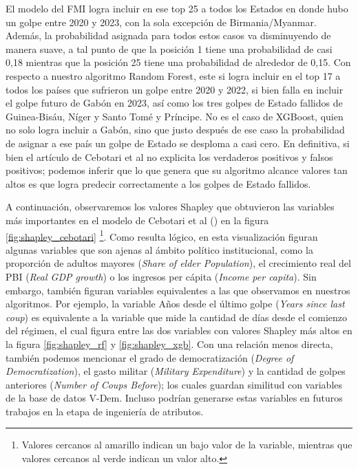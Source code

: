 \documentclass{article}
\begin{document}
El modelo del FMI logra incluir en ese top 25 a todos los Estados en donde hubo un golpe
entre 2020 y 2023, con la sola excepción de Birmania/Myanmar. Además, la probabilidad asignada para 
todos estos casos va disminuyendo de manera suave, a tal punto de que la posición 1 tiene una 
probabilidad de casi 0,18 mientras que la posición 25 tiene una probabilidad de alrededor de 0,15. Con
respecto a nuestro algoritmo Random Forest, este si logra incluir en el top 17 a todos los países que 
sufrieron un golpe entre 2020 y 2022, si bien falla en incluir el golpe futuro de Gabón en 2023, así como
los tres golpes de Estado fallidos de Guinea-Bisáu, Níger y Santo Tomé y Príncipe. No es 
el caso de XGBoost, quien no solo logra incluir a Gabón, sino que justo después de ese caso la 
probabilidad de asignar a ese país un golpe de Estado se desploma a casi cero. En definitiva, si bien 
el artículo de Cebotari et al no explicita los verdaderos positivos y falsos positivos; podemos inferir
que lo que genera que su algoritmo alcance valores tan altos es que logra predecir correctamente a los 
golpes de Estado fallidos.

A continuación, observaremos los valores Shapley que obtuvieron las variables más importantes en el
modelo de Cebotari et al (\citeyear{Ceb24}) en la figura \ref{fig:shapley_cebotari} \footnote{Valores 
cercanos al amarillo indican un bajo valor de la variable, mientras que valores cercanos al verde
indican un valor alto.}. Como resulta lógico, en esta visualización figuran algunas variables que son 
ajenas al ámbito político institucional, como
la proporción de adultos mayores (\textit{Share of elder Population}), el crecimiento real del PBI
(\textit{Real GDP growth}) o los ingresos per cápita (\textit{Income per capita}). Sin embargo, también
figuran variables equivalentes a las que observamos en nuestros algoritmos. Por ejemplo, la variable
Años desde el último golpe (\textit{Years since last coup}) es equivalente a la variable que mide la
cantidad de días desde el comienzo del régimen, el cual figura entre las dos variables con valores Shapley
más altos en la figura \ref{fig:shapley_rf} y \ref{fig:shapley_xgb}. Con una relación menos directa, también podemos
mencionar el grado de democratización (\textit{Degree of Democratization}), el gasto militar (\textit{Military
Expenditure}) y la cantidad de golpes anteriores (\textit{Number of Coups Before}); los cuales guardan 
similitud con variables de la base de datos V-Dem. Incluso podrían generarse estas variables en futuros 
trabajos en la etapa de ingeniería de atributos.
\end{document}
